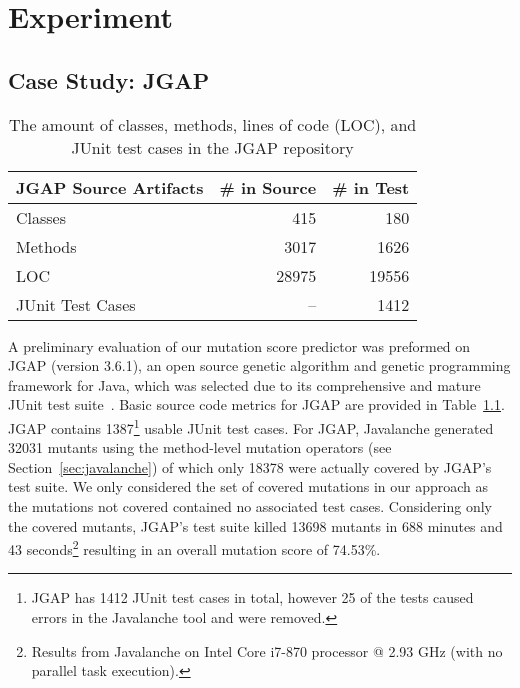 \chapter{Experiment}
\label{chap:experiment}

\section{Case Study: JGAP}
\label{sec:case_study}
\begin{table}[!b]
  \centering
  \begin{tabular}{|l|r|r|}
    \hline
    \rowcolor[RGB]{169,196,223}
    \textbf{JGAP Source Artifacts} & \textbf{\# in Source} & \textbf{\# in Test} \\
    \hline Classes & 415 & 180 \\
    \hline Methods & 3017 & 1626 \\
    \hline LOC & 28975 & 19556 \\
    \hline JUnit Test Cases & -- & 1412\footnotemark[1] \\
    \hline
  \end{tabular}
  \caption{The amount of classes, methods, lines of code (LOC), and JUnit test cases in the JGAP repository}
  \label{tab:jgap_source_stats}
\end{table}

A preliminary evaluation of our mutation score predictor was preformed on JGAP (version 3.6.1), an open source genetic algorithm and genetic programming framework for Java, which was selected due to its comprehensive and mature JUnit test suite~\cite{JGAP}. Basic source code metrics for JGAP are provided in Table~\ref{tab:jgap_source_stats}. JGAP contains 1387\footnote{JGAP has 1412 JUnit test cases in total, however 25 of the tests caused errors in the Javalanche tool and were removed.} usable JUnit test cases. For JGAP, Javalanche generated 32031 mutants using the method-level mutation operators (see Section~\ref{sec:javalanche}) of which only 18378 were actually covered by JGAP's test suite. We only considered the set of covered mutations in our approach as the mutations not covered contained no associated test cases. Considering only the covered mutants, JGAP's test suite killed 13698 mutants in 688 minutes and 43 seconds\footnote{Results from Javalanche on Intel Core i7-870 processor @ 2.93 GHz (with no parallel task execution).} resulting in an overall mutation score of 74.53\%.


